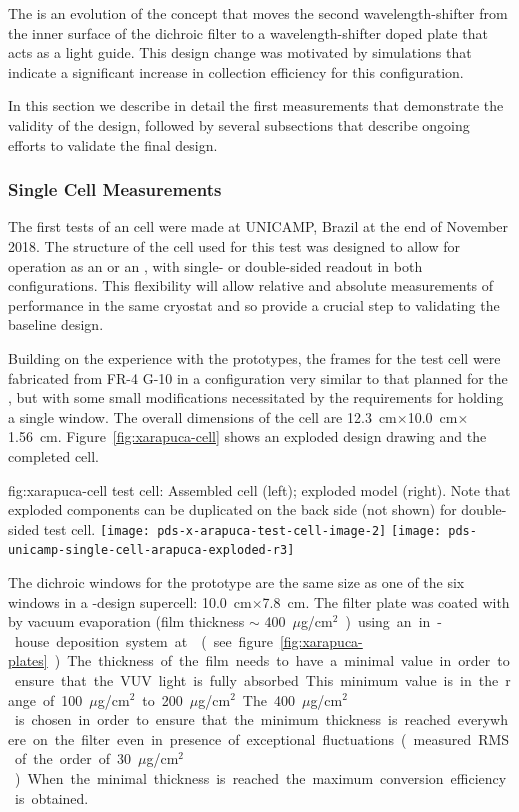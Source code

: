 The  is an evolution of the  concept that moves the second wavelength-shifter from the inner surface of the dichroic filter to a wavelength-shifter doped plate that acts as a light guide. This design change was motivated by simulations that indicate a significant increase in collection efficiency for this configuration. 

In this section we describe in detail the first measurements that demonstrate the validity of the design, followed by several subsections that describe ongoing efforts to validate the final design.

\subsubsection{Single Cell  Measurements}
\label{sec:xarapuca-unicamp}
The first tests of an  cell were made at UNICAMP, Brazil at the end of November 2018. 
The structure of the cell used for this test was designed to allow for operation as an  or an , with single- or double-sided readout in both configurations.  This flexibility will allow relative and absolute measurements of performance in the same cryostat and so provide a crucial step to validating the baseline design.

Building on the experience with the  prototypes, the frames for the test cell were fabricated from FR-4 G-10 in a configuration very similar to that planned for the , but with some small modifications necessitated by the requirements for holding a single window. The overall dimensions of the cell are \SI{12.3}{cm}$\times$\SI{10.0}{cm}$\times$\SI{1.56}{cm}. Figure~\ref{fig:xarapuca-cell} shows an exploded design drawing and the completed cell. 

\begin{dunefigure}{fig:xarapuca-cell}
{ test cell:  Assembled cell (left); exploded model (right).  Note that exploded components can be duplicated on the back side (not shown) for double-sided test cell.} 
	\texttt{[image: pds-x-arapuca-test-cell-image-2]}
	    \texttt{[image: pds-unicamp-single-cell-arapuca-exploded-r3]}
\end{dunefigure}


The dichroic windows for the prototype are the same size as one of the six windows in a -design  supercell: \SI{10.0}{cm}$\times$\SI{7.8}{cm}. The filter plate was coated with  by vacuum evaporation (film thickness $\sim$ \SI{400}{${\mu}$g/cm$^2$})  using an in-house deposition system at  (see figure \ref{fig:xarapuca-plates}). 
The thickness of the film needs to have a minimal value in order to ensure that the VUV light is fully absorbed. This minimum value is in the range of \SI{100}{${\mu}$g/cm$^2$} to \SI{200}{${\mu}$g/cm$^2$}. The  \SI{400}{${\mu}$g/cm$^2$} is chosen in order to ensure that the minimum thickness is reached everywhere on the filter even in presence of exceptional fluctuations (measured RMS of the order of \SI{30}{${\mu}$g/cm$^2$}). When the minimal thickness is reached the maximum conversion efficiency is obtained.


